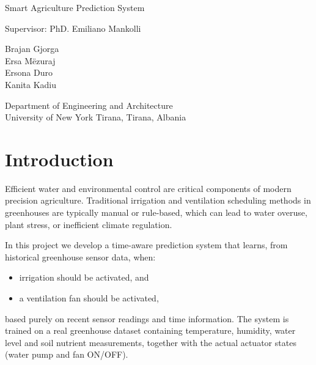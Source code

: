 \documentclass[sn-mathphys,Numbered]{sn-jnl}
\begin{document}

\begin{titlepage}
  \centering
  \vspace*{0.25\textheight} %

  {\LARGE Smart Agriculture Prediction System\par}
  \vspace{0.5cm}
  {\large Supervisor: PhD. Emiliano Mankolli\par}
  \vspace{1.0cm}

  {\large
      Brajan Gjorga\\
      Ersa M\"ezuraj\\
      Ersona Duro\\
      Kanita Kadiu\par
  }
  \vspace{1.0cm}

  {\large
      Department of Engineering and Architecture\\
      University of New York Tirana, Tirana, Albania\par
  }

  \vfill
\end{titlepage}

\setcounter{page}{1}
\tableofcontents
\clearpage


\section{Introduction}\label{sec:intro}

Efficient water and environmental control are critical components of modern precision agriculture.  
Traditional irrigation and ventilation scheduling methods in greenhouses are typically manual or rule-based, which can lead to water overuse, plant stress, or inefficient climate regulation.  

In this project we develop a time-aware prediction system that learns, from historical greenhouse sensor data, when:
\begin{itemize}
    \item irrigation should be activated, and
    \item a ventilation fan should be activated,
\end{itemize}
based purely on recent sensor readings and time information.  
The system is trained on a real greenhouse dataset containing temperature, humidity, water level and soil nutrient measurements, together with the actual actuator states (water pump and fan ON/OFF).  
\end{document}
